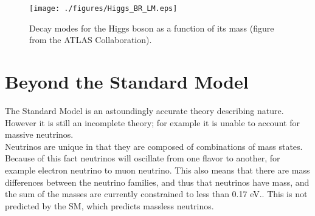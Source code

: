 \begin{figure}[h!]
  \centering
	\texttt{[image: ./figures/Higgs\_BR\_LM.eps]}
\caption[Higgs boson decay modes]{\label{fig:higgsdecays}{ Decay modes for the Higgs boson as a function of its mass (figure from the ATLAS Collaboration). }} 
\end{figure}	
	
		

	


	
		
		
		





\section{Beyond the Standard Model}

The Standard Model is an astoundingly accurate theory describing nature.  However it is still an incomplete theory; for example it is unable to account for massive neutrinos. \\%


Neutrinos are unique in that they are composed of combinations of mass states.  Because of this fact neutrinos will oscillate from one flavor to another\cite{SuperKneutrinos}, for example electron neutrino to muon neutrino.  This also means that there are mass differences between the neutrino families, and thus that neutrinos have mass, and the sum of the masses are currently constrained to less than 0.17 eV.\cite{pdg}.  This is not predicted by the SM, which predicts massless neutrinos. \\


